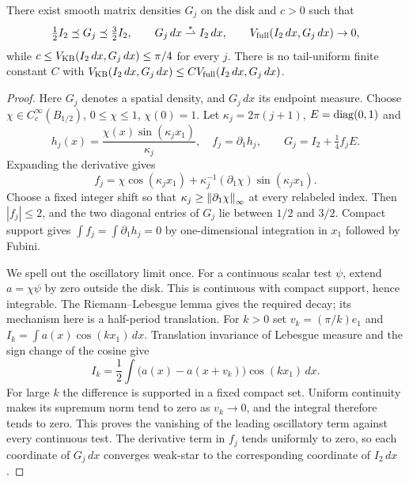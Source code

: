 \begin{theorem}\label{thm:separation}
There exist smooth matrix densities $G_j$ on the disk and $c>0$ such that
\[
 \tfrac12I_2\preceq G_j\preceq\tfrac32I_2,
 \qquad G_j\,dx\overset{*}{\rightharpoonup} I_2\,dx,
 \qquad V_{\rm full}(I_2\,dx,G_j\,dx)\to0,
\]
while $c\le V_{\rm KB}(I_2\,dx,G_j\,dx)\le\pi/4$ for every $j$.
There is no tail-uniform finite constant $C$ with
$V_{\rm KB}(I_2\,dx,G_j\,dx)\le C V_{\rm full}(I_2\,dx,G_j\,dx)$.
\end{theorem}
\begin{proof}
Here $G_j$ denotes a spatial density, and $G_j\,dx$ its endpoint measure.
Choose $\chi\in C_c^\infty(B_{1/2})$, $0\le\chi\le1$, $\chi(0)=1$.
Let $\kappa_j=2\pi(j+1)$, $E=\operatorname{diag}(0,1)$ and
\[
 h_j(x)=\frac{\chi(x)\sin(\kappa_jx_1)}{\kappa_j},\quad
 f_j=\partial_1h_j,
 \qquad G_j=I_2+\tfrac14 f_jE.
\]
Expanding the derivative gives
\[
 f_j=\chi\cos(\kappa_jx_1)
       +\kappa_j^{-1}(\partial_1\chi)\sin(\kappa_jx_1).
\]
Choose a fixed integer shift so that
$\kappa_j\ge\left\lVert \partial_1\chi\right\rVert_\infty$ at every relabeled index.
Then $|f_j|\le2$, and the two diagonal entries of $G_j$ lie between
$1/2$ and $3/2$. Compact support gives $\int f_j=\int\partial_1h_j=0$
by one-dimensional integration in $x_1$ followed by Fubini.

We spell out the oscillatory limit once. For a continuous scalar test
$\psi$, extend $a=\chi\psi$ by zero outside the disk. This is continuous
with compact support, hence integrable. The Riemann--Lebesgue lemma gives
the required decay; its mechanism here is a half-period translation.
For $k>0$ set $v_k=(\pi/k)e_1$ and $I_k=\int a(x)\cos(kx_1)\,dx$.
Translation invariance of Lebesgue measure and the sign change of the
cosine give
\[
 I_k=\frac12\int\bigl(a(x)-a(x+v_k)\bigr)\cos(kx_1)\,dx.
\]
For large $k$ the difference is supported in a fixed compact set. Uniform
continuity makes its supremum norm tend to zero as $v_k\to0$, and the
integral therefore tends to zero. This proves the vanishing of the leading
oscillatory term against every continuous test.
The derivative term in $f_j$ tends uniformly to zero, so each coordinate
of $G_j\,dx$ converges weak-star to the corresponding coordinate of
$I_2\,dx$.


\end{proof}
